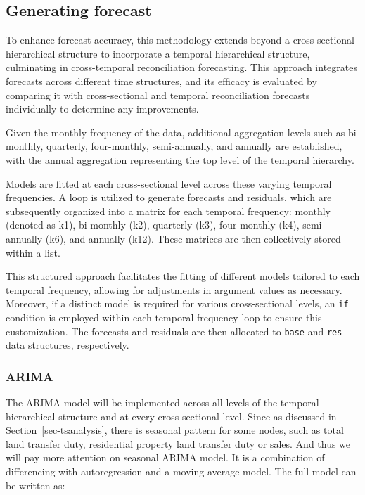 \documentclass[
  11pt,
  a4paper,
]{article}
\begin{document}
\subsection{Generating forecast}\label{generating-forecast}

To enhance forecast accuracy, this methodology extends beyond a
cross-sectional hierarchical structure to incorporate a temporal
hierarchical structure, culminating in cross-temporal reconciliation
forecasting. This approach integrates forecasts across different time
structures, and its efficacy is evaluated by comparing it with
cross-sectional and temporal reconciliation forecasts individually to
determine any improvements.

Given the monthly frequency of the data, additional aggregation levels
such as bi-monthly, quarterly, four-monthly, semi-annually, and annually
are established, with the annual aggregation representing the top level
of the temporal hierarchy.

Models are fitted at each cross-sectional level across these varying
temporal frequencies. A loop is utilized to generate forecasts and
residuals, which are subsequently organized into a matrix for each
temporal frequency: monthly (denoted as k1), bi-monthly (k2), quarterly
(k3), four-monthly (k4), semi-annually (k6), and annually (k12). These
matrices are then collectively stored within a list.

This structured approach facilitates the fitting of different models
tailored to each temporal frequency, allowing for adjustments in
argument values as necessary. Moreover, if a distinct model is required
for various cross-sectional levels, an \texttt{if} condition is employed
within each temporal frequency loop to ensure this customization. The
forecasts and residuals are then allocated to \texttt{base} and
\texttt{res} data structures, respectively.

\subsubsection{ARIMA}\label{arima}

The ARIMA model will be implemented across all levels of the temporal
hierarchical structure and at every cross-sectional level. Since as
discussed in Section~\ref{sec-tsanalysis}, there is seasonal pattern for
some nodes, such as total land transfer duty, residential property land
transfer duty or sales. And thus we will pay more attention on seasonal
ARIMA model. It is a combination of differencing with autoregression and
a moving average model. The full model can be written as:
\end{document}
